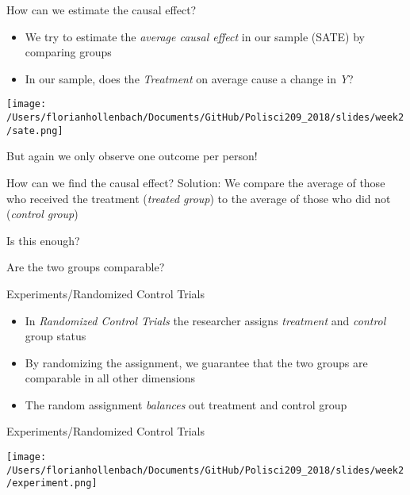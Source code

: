 \documentclass[presentation]{beamer}
\begin{document}
\begin{frame}[label={sec:org9c57b03}]{How can we estimate the causal effect?}
\begin{itemize}
\item We try to estimate the \emph{average causal effect} in our sample (SATE) by comparing groups
\item In our sample, does the \emph{Treatment} on average cause a change in \emph{Y}?
\end{itemize}
\pause
\begin{center}
\texttt{[image: /Users/florianhollenbach/Documents/GitHub/Polisci209\_2018/slides/week2/sate.png]}
\end{center}
But again we only observe one outcome per person!
\end{frame}

\begin{frame}[label={sec:org858112f}]{How can we find the causal effect?}
Solution: We compare the average of those who received the treatment (\emph{treated group}) to the average of those who did not (\emph{control group})
\pause


Is this enough?

\pause
Are the two groups comparable?
\end{frame}


\begin{frame}[label={sec:orgeef2fa6}]{Experiments/Randomized Control Trials}
\begin{itemize}
\item In \emph{Randomized Control Trials} the researcher assigns \emph{treatment} and \emph{control} group status
\end{itemize}
\pause
\begin{itemize}
\item By randomizing the assignment, we guarantee that the two groups are comparable in all other dimensions
\item The random assignment \emph{balances} out treatment and control group
\end{itemize}
\end{frame}

\begin{frame}[label={sec:org4a4639a}]{Experiments/Randomized Control Trials}
\begin{center}
\texttt{[image: /Users/florianhollenbach/Documents/GitHub/Polisci209\_2018/slides/week2/experiment.png]}
\end{center}
\end{frame}
\end{document}
